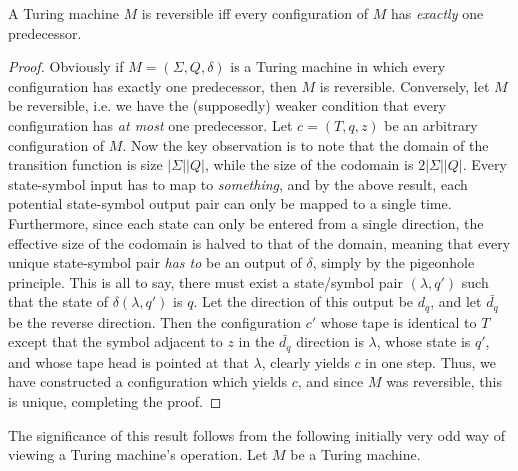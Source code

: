 \begin{corollary}
	A Turing machine $M$ is reversible iff every configuration of $M$ has \textit{exactly} one predecessor. 
\end{corollary}
\begin{proof}
	Obviously if $M = (\Sigma,Q,\delta)$ is a Turing machine in which every configuration has exactly one predecessor, then $M$ is reversible. Conversely, let $M$ be reversible, i.e. we have the (supposedly) weaker condition that every configuration has \textit{at most} one predecessor. Let $c = (T,q,z)$ be an arbitrary configuration of $M$. Now the key observation is to note that the domain of the transition function is size $|\Sigma||Q|$, while the size of the codomain is $2|\Sigma||Q|$. Every state-symbol input has to map to \textit{something}, and by the above result, each potential state-symbol output pair can only be mapped to a single time. Furthermore, since each state can only be entered from a single direction, the effective size of the codomain is halved to that of the domain, meaning that every unique state-symbol pair \textit{has to} be an output of $\delta$, simply by the pigeonhole principle. This is all to say, there must exist a state/symbol pair $(\lambda,q')$ such that the state of $\delta(\lambda,q')$ is $q$. Let the direction of this output be $d_q$, and let $\bar{d_q}$ be the reverse direction. Then the configuration $c'$ whose tape is identical to $T$ except that the symbol adjacent to $z$ in the $\bar{d_q}$ direction is $\lambda$, whose state is $q'$, and whose tape head is pointed at that $\lambda$, clearly yields $c$ in one step. Thus, we have constructed a configuration which yields $c$, and since $M$ was reversible, this is unique, completing the proof. 
\end{proof}
The significance of this result follows from the following initially very odd way of viewing a Turing machine's operation. Let $M$ be a Turing machine. 	

